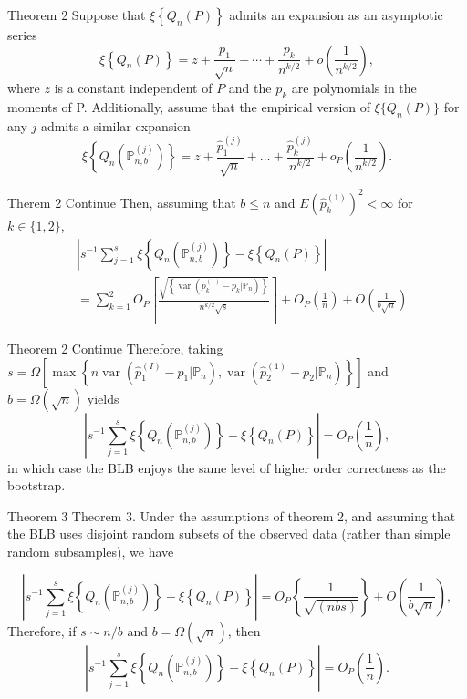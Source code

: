 \documentclass[12pt]{beamer}
\begin{document}
\begin{frame}{Theorem 2}
Suppose that $\xi\left\{Q_{n}(P)\right\}$ admits an expansion as an asymptotic series
$$
\xi\left\{Q_{n}(P)\right\}=z+\frac{p_{1}}{\sqrt{n}}+\cdots+\frac{p_{k}}{n^{k / 2}}+o\left(\frac{1}{n^{k / 2}}\right),
$$
where $z$ is a constant independent of $P$ and the $p_k$ are polynomials in the moments of P. Additionally, assume that the empirical version of $\xi\{Q_n(P)\}$ for any $j$ admits a similar expansion
$$
\xi\left\{Q_{n}\left(\mathbb{P}_{n, b}^{(j)}\right)\right\}=z+\frac{\hat{p}_{1}^{(j)}}{\sqrt{n}}+\ldots+\frac{\hat{p}_{k}^{(j)}}{n^{k / 2}}+o_{P}\left(\frac{1}{n^{k / 2}}\right).
$$

\end{frame}
\begin{frame}{Therem 2 Continue}
Then, assuming that $b \le n$ and $E\left(\hat{p}_{k}^{(1)}\right)^{2}<\infty$ for $k \in \{1,2\}$,
$$
\begin{aligned}
&\left|s^{-1} \sum_{j=1}^{s} \xi\left\{Q_{n}\left(\mathbb{P}_{n, b}^{(j)}\right)\right\}-\xi\left\{Q_{n}(P)\right\}\right|\\
&=\sum_{k=1}^{2} O_{P}\left[\frac{\sqrt{\left\{\operatorname{var}\left(\hat{p}_{k}^{(1)}-p_{k} | \mathbb{P}_{n}\right)\right\}}}{n^{k / 2} \sqrt{s}}\right]+O_{P}\left(\frac{1}{n}\right)+O\left(\frac{1}{b \sqrt{n}}\right)
\end{aligned}
$$
\end{frame}
\begin{frame}{Theorem 2 Continue}
Therefore, taking $s=\Omega\left[\max \left\{n \operatorname{var}\left(\hat{p}_{1}^{(I)}-p_{1} | \mathbb{P}_{n}\right), \operatorname{var}\left(\hat{p}_{2}^{(1)}-p_{2} | \mathbb{P}_{n}\right)\right\}\right]$ and $b=\Omega(\sqrt{n})$ yields
$$
\left|s^{-1} \sum_{j=1}^{s} \xi\left\{Q_{n}\left(\mathbb{P}_{n, b}^{(j)}\right)\right\}-\xi\left\{Q_{n}(P)\right\}\right|=O_{P}\left(\frac{1}{n}\right),
$$
in which case the BLB enjoys the same level of higher order correctness as the bootstrap.
\end{frame}

\begin{frame}{Theorem 3}
Theorem 3. Under the assumptions of theorem 2, and assuming that the BLB uses disjoint
random subsets of the observed data (rather than simple random subsamples), we have

$$
\left|s^{-1} \sum_{j=1}^{s} \xi\left\{Q_{n}\left(\mathbb{P}_{n, b}^{(j)}\right)\right\}-\xi\left\{Q_{n}(P)\right\}\right|=O_{P}\left\{\frac{1}{\sqrt{(n b s)}}\right\}+O\left(\frac{1}{b \sqrt{n}}\right),
$$
Therefore, if $s\sim n/b$ and $b=\Omega(\sqrt{n})$, then
$$
\left|s^{-1} \sum_{j=1}^{s} \xi\left\{Q_{n}\left(\mathbb{P}_{n, b}^{(j)}\right)\right\}-\xi\left\{Q_{n}(P)\right\}\right|=O_{P}\left(\frac{1}{n}\right).
$$
\end{frame}
\end{document}
